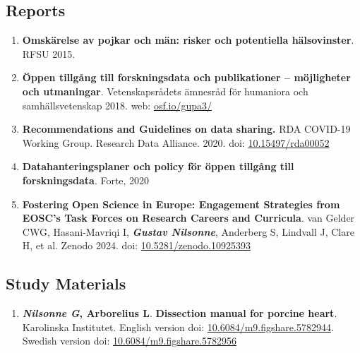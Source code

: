 \documentclass[10pt]{article}
\begin{document}
\subsection*{Reports}
\begin{enumerate}[nolistsep]
\item \textbf{Omskärelse av pojkar och män: risker och potentiella hälsovinster}. RFSU 2015.
\item \textbf{Öppen tillgång till forskningsdata och publikationer – möjligheter och utmaningar}. Vetenskapsrådets ämnesråd för humaniora och samhällsvetenskap 2018. web: \href{https://osf.io/gupa3/}{osf.io/gupa3/}
\item \textbf{Recommendations and Guidelines on data sharing.} RDA COVID-19 Working Group. Research Data Alliance. 2020. doi: \href{https://doi.org/10.15497/rda00052}{10.15497/rda00052}
\item \textbf{Datahanteringsplaner och policy för öppen tillgång till forskningsdata}. Forte, 2020
\item \textbf{Fostering Open Science in Europe: Engagement Strategies from EOSC's Task Forces on Research Careers and Curricula}. van Gelder CWG, Hasani-Mavriqi I, \textbf{\textit{Gustav Nilsonne}}, Anderberg S, Lindvall J, Clare H, et al. Zenodo 2024. doi: \href{https://doi.org/10.5281/zenodo.10925393}{10.5281/zenodo.10925393}
\end{enumerate}


\subsection*{Study Materials}
\begin{enumerate}[nolistsep]
\item \textbf{\textit{Nilsonne G}, Arborelius L}. \textbf{Dissection manual for porcine heart}. Karolinska Institutet. English version doi:
\href{https://doi.org/10.6084/m9.figshare.5782944}{10.6084/m9.figshare.5782944}. Swedish version doi:
\href{https://doi.org/10.6084/m9.figshare.5782956}{10.6084/m9.figshare.5782956}
\end{enumerate}
\end{document}
